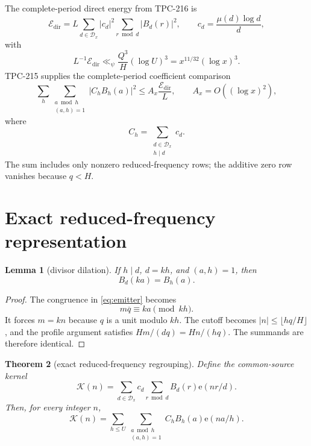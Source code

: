 \documentclass[11pt]{article}
\newtheorem{theorem}{Theorem}[section]
\newtheorem{lemma}[theorem]{Lemma}
\theoremstyle{definition}
\theoremstyle{remark}
\newcommand{\Dx}{\mathcal D_x}
\newcommand{\ee}{\mathrm e}
\newcommand{\Kphys}{\mathcal K}
\newcommand{\Edir}{\mathcal E_{\mathrm{dir}}}
\begin{document}
The complete-period direct energy from TPC-216 is
\begin{equation}
 \Edir=L\sum_{d\in\Dx}|c_d|^2\sum_{r\bmod d}|B_d(r)|^2,
 \qquad c_d=\frac{\mu(d)\log d}{d},
 \label{eq:direct}
\end{equation}
with
\begin{equation}
 L^{-1}\Edir\ll_{\psi}\frac{Q^3}{H}(\log U)^3
 =x^{11/32}(\log x)^3.
 \label{eq:tpc216}
\end{equation}
TPC-215 supplies the complete-period coefficient comparison
\begin{equation}
 \sum_{h}\sum_{\substack{a\bmod h\\(a,h)=1}}
 |C_hB_h(a)|^2
 \le A_x\frac{\Edir}{L},
 \qquad A_x=O((\log x)^2),
 \label{eq:tpc215}
\end{equation}
where
\begin{equation}
 C_h=\sum_{\substack{d\in\Dx\\h\mid d}}c_d.
 \label{eq:Ch}
\end{equation}
The sum includes only nonzero reduced-frequency rows; the additive zero row
vanishes because $q<H$.

\section{Exact reduced-frequency representation}

\begin{lemma}[divisor dilation]
\label{lem:dilation}
If $h\mid d$, $d=kh$, and $(a,h)=1$, then
\[
 B_d(ka)=B_h(a).
\]
\end{lemma}

\begin{proof}
The congruence in \eqref{eq:emitter} becomes
\[
 m\overline q\equiv ka\pmod{kh}.
\]
It forces $m=kn$ because $q$ is a unit modulo $kh$.  The cutoff becomes
$|n|\le\lfloor hq/H\rfloor$, and the profile argument satisfies
$Hm/(dq)=Hn/(hq)$.  The summands are therefore identical.
\end{proof}

\begin{theorem}[exact reduced-frequency regrouping]
\label{thm:regroup}
Define the common-source kernel
\begin{equation}
 \Kphys(n)=\sum_{d\in\Dx}c_d\sum_{r\bmod d}B_d(r)\ee(nr/d).
 \label{eq:kernel}
\end{equation}
Then, for every integer $n$,
\begin{equation}
 \Kphys(n)=
 \sum_{h\le U}\sum_{\substack{a\bmod h\\(a,h)=1}}
 C_hB_h(a)\ee(na/h).
 \label{eq:regroup}
\end{equation}
\end{theorem}
\end{document}
